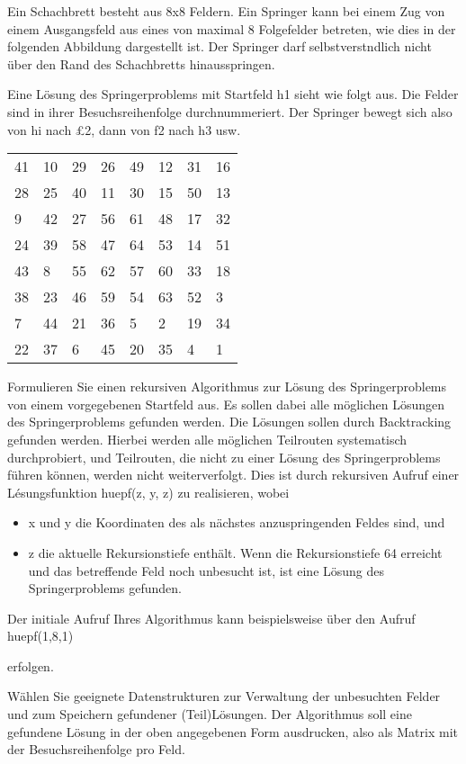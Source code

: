 \documentclass{lehramt-informatik}
\begin{document}
Ein Schachbrett besteht aus 8x8 Feldern. Ein Springer kann bei einem Zug
von einem Ausgangsfeld aus eines von maximal 8 Folgefelder betreten, wie
dies in der folgenden Abbildung dargestellt ist. Der Springer darf
selbstverstndlich nicht über den Rand des Schachbretts hinausspringen.

Eine Lösung des Springerproblems mit Startfeld h1 sieht wie folgt aus.
Die Felder sind in ihrer Besuchsreihenfolge durchnummeriert. Der
Springer bewegt sich also von hi nach £2, dann von f2 nach h3 usw.

\begin{tabular}{llllllll}
41&10&29&26&49&12&31&16\\
28&25&40&11&30&15&50&13\\
9&42&27&56&61&48&17&32\\
24&39&58&47&64&53&14&51\\
43&8&55&62&57&60&33&18\\
38&23&46&59&54&63&52&3\\
7&44&21&36&5&2&19&34\\
22&37&6&45&20&35&4&1\\
\end{tabular}

Formulieren Sie einen rekursiven Algorithmus zur Lösung des
Springerproblems von einem vorgegebenen Startfeld aus. Es sollen dabei
alle möglichen Lösungen des Springerproblems gefunden werden. Die
Lösungen sollen durch Backtracking gefunden werden. Hierbei werden alle
möglichen Teilrouten systematisch durchprobiert, und Teilrouten, die
nicht zu einer Lösung des Springerproblems führen können, werden nicht
weiterverfolgt. Dies ist durch rekursiven Aufruf einer Lésungsfunktion
huepf(z, y, z) zu realisieren, wobei

\begin{itemize}

\item x und y die Koordinaten des als nächstes anzuspringenden Feldes
sind, und

\item z die aktuelle Rekursionstiefe enthält. Wenn die Rekursionstiefe
64 erreicht und das betreffende Feld noch unbesucht ist, ist eine Lösung
des Springerproblems gefunden.
\end{itemize}

Der initiale Aufruf Ihres Algorithmus kann beispielsweise über den Aufruf
huepf(1,8,1)

erfolgen.

Wählen Sie geeignete Datenstrukturen zur Verwaltung der unbesuchten
Felder und zum Speichern gefundener (Teil)Lösungen. Der Algorithmus soll
eine gefundene Lösung in der oben angegebenen Form ausdrucken, also als
Matrix mit der Besuchsreihenfolge pro Feld.

\literatur
\end{document}
